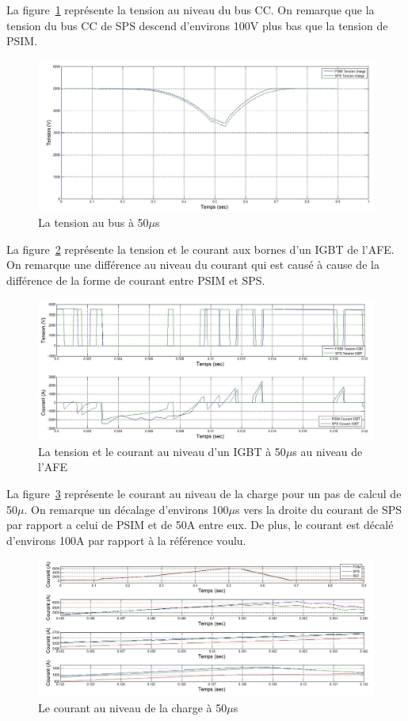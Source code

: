 \documentclass[11pt,letterpaper,final]{report}
\begin{document}
La figure~\ref{AF_HA_vch50} représente la tension au niveau du bus CC. On remarque que la tension du bus CC de SPS descend d'environs 100V plus bas que la tension de PSIM.
\begin{figure}[htb]
\centering
\includegraphics[scale=0.5]{Fig/Hach_AFE/50u/ten_bus.jpg}
\caption{La tension au bus à 50$\mu$s}
\label{AF_HA_vch50}
\end{figure}

La figure~\ref{AF_HA_IGBT50} représente la tension et le courant aux bornes d'un IGBT de l'AFE. On remarque une différence au niveau du courant qui est causé à cause de la différence de la forme de courant entre PSIM et SPS. 

\begin{figure}[htb]
\centering
\includegraphics[scale=0.5]{Fig/Hach_AFE/50u/IGBT_AFE.jpg}
\caption{La tension et le courant au niveau d'un IGBT à 50$\mu$s au niveau de l'AFE}
\label{AF_HA_IGBT50}
\end{figure}
La figure~\ref{AF_HA_CHA50} représente le courant au niveau de la charge pour un pas de calcul de 50$\mu$. On remarque un décalage d'environs  100$\mu$s vers la droite du courant de SPS par rapport a celui de PSIM et de 50A entre eux. De plus, le courant est décalé d'environs 100A par rapport à la référence voulu. 

\begin{figure}[htb]
\centering
\includegraphics[scale=0.5]{Fig/Hach_AFE/50u/hach_cou_ch.jpg}
\caption{Le courant au niveau de la charge à 50$\mu$s}
\label{AF_HA_CHA50}
\end{figure}
\end{document}
